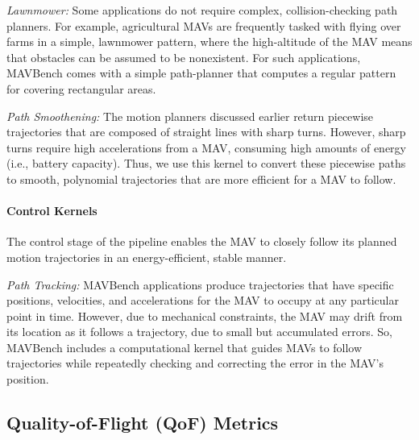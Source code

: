 \textit{Lawnmower:} Some applications do not require complex, collision-checking path planners. For example, agricultural MAVs are frequently tasked with flying over farms in a simple, lawnmower pattern, where the high-altitude of the MAV means that obstacles can be assumed to be nonexistent. For such applications, MAVBench comes with a simple path-planner that computes a regular pattern for covering rectangular areas.

\textit{Path Smoothening:} The motion planners discussed earlier return piecewise trajectories that are composed of straight lines with sharp turns. However, sharp turns require high accelerations from a MAV, consuming high amounts of energy (i.e., battery capacity). Thus, we use this kernel to convert these piecewise paths to smooth, polynomial trajectories that are more efficient for a MAV to follow.

\paragraph{Control Kernels} The control stage of the pipeline enables the MAV to closely follow its planned motion trajectories in an energy-efficient, stable manner. 

\textit{Path Tracking:} MAVBench applications produce trajectories that have specific positions, velocities, and accelerations for the MAV to occupy at any particular point in time. However, due to mechanical constraints, the MAV may drift from its location as it follows a trajectory, due to small but accumulated errors. So, MAVBench includes a computational kernel that guides MAVs to follow trajectories while repeatedly checking and correcting the error in the MAV's position.

\subsection{Quality-of-Flight (QoF) Metrics}
\label{sec:QoF}


